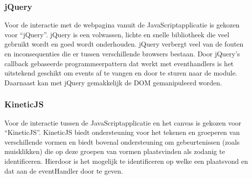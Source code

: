 \subsubsection{jQuery}
Voor de interactie met de webpagina vanuit de JavaScriptapplicatie is gekozen voor ``jQuery''\cite{jQuery}. jQuery is een volwassen, lichte en snelle bibliotheek die veel gebruikt wordt en goed wordt onderhouden. jQuery verbergt veel van de fouten en inconsequenties die er tussen verschillende browsers bestaan. Door jQuery's callback gebaseerde programmeerpattern dat werkt met eventhandlers is het uitstekend geschikt om events af te vangen en door te sturen naar de module. Daarnaast kan met jQuery gemakkelijk de DOM gemanipuleerd worden.

\subsubsection{KineticJS}
Voor de interactie tussen de JavaScriptapplicatie en het canvas is gekozen voor ``KineticJS''\cite{KineticJS}. KineticJS biedt ondersteuning voor het tekenen en groeperen van verschillende vormen en biedt bovenal ondersteuning om gebeurtenissen (zoals muisklikken) die op deze groepen van vormen plaatsvinden als zodanig te identificeren. Hierdoor is het mogelijk te identificeren op welke  een  plaatsvond en dat aan de eventHandler door te geven.
